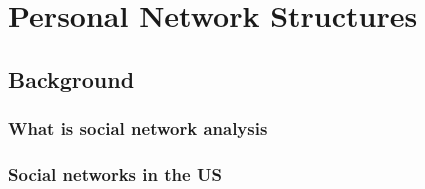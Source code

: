 \chapter{Personal Network Structures}
  \section{Background}
    \subsection{What is social network analysis}
    \subsection{Social networks in the US}

